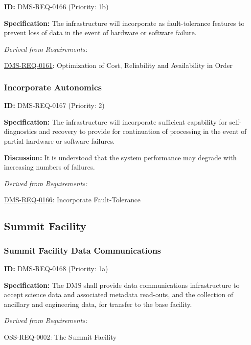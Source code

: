 \documentclass[SE,toc,lsstdraft]{lsstdoc}
\begin{document}
\label{DMS-REQ-0166}
\textbf{ID:} DMS-REQ-0166 (Priority: 1b)

\textbf{Specification: }The infrastructure will incorporate as fault-tolerance features to prevent loss of data in the event of hardware or software failure.

\emph{Derived from Requirements:}

\hyperref[DMS-REQ-0161]{DMS-REQ-0161}:
Optimization of Cost, Reliability and Availability in Order \newline

\subsubsection{Incorporate Autonomics}

\label{DMS-REQ-0167}
\textbf{ID:} DMS-REQ-0167 (Priority: 2)

\textbf{Specification:} The infrastructure will incorporate sufficient capability for self-diagnostics and recovery to provide for continuation of processing in the event of partial hardware or software failures.

\textbf{Discussion: }It is understood that the system performance may degrade with increasing numbers of failures.

\emph{Derived from Requirements:}

\hyperref[DMS-REQ-0166]{DMS-REQ-0166}:
Incorporate Fault-Tolerance \newline

\subsection{Summit Facility}

\subsubsection{Summit Facility Data Communications}

\label{DMS-REQ-0168}
\textbf{ID:} DMS-REQ-0168 (Priority: 1a)

\textbf{Specification:} The DMS shall provide data communications infrastructure to accept science data and associated metadata read-outs, and the collection of ancillary and engineering data, for transfer to the base facility.

\emph{Derived from Requirements:}

OSS-REQ-0002:
The Summit Facility \newline
\end{document}
